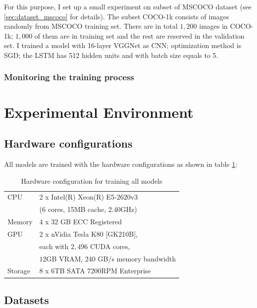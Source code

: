 	For this purpose, I set up a small experiment on subset of MSCOCO dataset (see \ref{sec:dataset_mscoco} for details). The subset COCO-1k consists of images randomly from MSCOCO training set. There are in total $1,200$ images in COCO-1k; $1,000$ of them are in training set and the rest are reserved in the validation set. I trained a model with 16-layer VGGNet as CNN; optimization method is SGD; the LSTM has 512 hidden units and with batch size equals to 5.

	\subsubsection{Monitoring the training process}
	\label{sec:monitoring}

\section{Experimental Environment}
\label{sec:chap4_environment}

\subsection{Hardware configurations}
\label{sec:hardware}
All models are trained with the hardware configurations as shown in table \ref{tab:hardware_configuration}:

\begin{table}
	\centering
	\caption{Hardware configuration for training all models}	
	\label{tab:hardware_configuration}
	\begin{tabularx}{0.65\textwidth}{ll}
		\toprule
		CPU & 2 x Intel(R) Xeon(R) E5-2620v3 \\
			& (6 cores, 15MB cache, 2.40GHz) \\
		\midrule
		Memory & 4 x 32 GB ECC Registered \\
		\midrule 
		GPU & 2 x nVidia Tesla K80 [GK210B], \\
			& each with $2,496$ CUDA cores, \\
			& $12$GB VRAM, 240 GB/s memory bandwidth \\
		\midrule
		Storage & 8 x 6TB SATA 7200RPM Enterprise \\
		\bottomrule
	\end{tabularx}
\end{table}

\subsection{Datasets}
